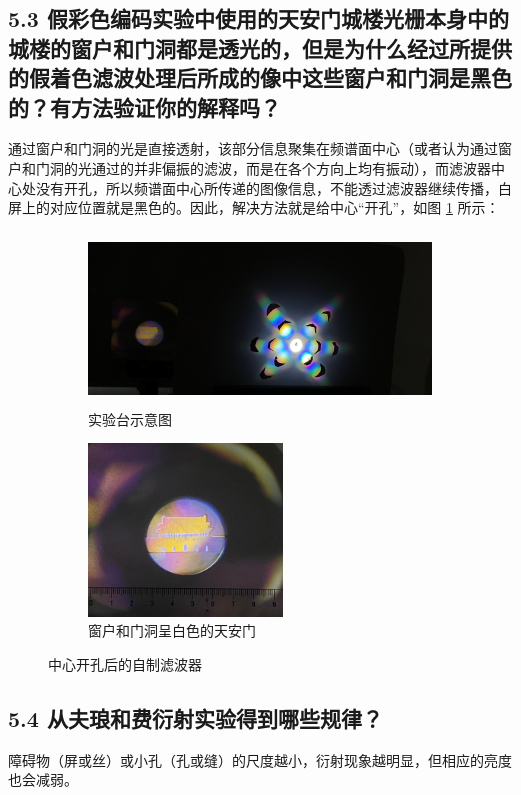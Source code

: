 \documentclass[UTF8]{article}
\theoremstyle{MyLineTheoremStyle} %
\theoremstyle{MyBlockTheoremStyle} %
\theoremstyle{MySubsubsectionStyle} %
\begin{document}
\subsection*{5.3 假彩色编码实验中使用的天安门城楼光栅本身中的城楼的窗户和门洞都是透光的，但是为什么经过所提供的假着色滤波处理后所成的像中这些窗户和门洞是黑色的？有方法验证你的解释吗？}
通过窗户和门洞的光是直接透射，该部分信息聚集在频谱面中心（或者认为通过窗户和门洞的光通过的并非偏振的滤波，而是在各个方向上均有振动），而滤波器中心处没有开孔，所以频谱面中心所传递的图像信息，不能透过滤波器继续传播，白屏上的对应位置就是黑色的。因此，解决方法就是给中心“开孔”，如图 \ref{中心开孔后的自制滤波器} 所示：
\begin{figure}[H]\centering
\begin{subfigure}[b]{0.66\columnwidth}\centering
    \includegraphics[height=130pt]{assets/3 假彩编码/自制滤波器 亮.jpg}
    \caption{实验台示意图}
\end{subfigure}\hfill
\begin{subfigure}[b]{0.33\columnwidth}\centering
    \includegraphics[height=130pt]{assets/3 假彩编码/天安门 自制 亮.jpg}
    \caption{窗户和门洞呈白色的天安门}
\end{subfigure}
\caption{中心开孔后的自制滤波器}
\label{中心开孔后的自制滤波器}
\end{figure}

\subsection*{5.4 从夫琅和费衍射实验得到哪些规律？}
障碍物（屏或丝）或小孔（孔或缝）的尺度越小，衍射现象越明显，但相应的亮度也会减弱。
\end{document}
